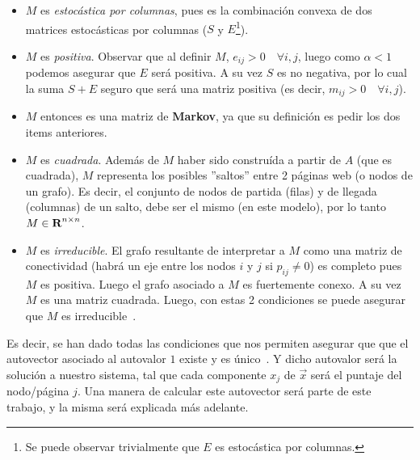 \begin{itemize}
    \item $M$ es \textit{estoc\'astica por columnas}, pues es la combinaci\'on convexa de
        dos matrices estoc\'asticas por columnas ($S$ y $E$\footnote{Se puede
        observar trivialmente que $E$ es estoc\'astica por columnas.}).

    \item $M$ es \textit{positiva}. Observar que al definir $M$, $e_{ij} >
        0\quad\forall i,j$, luego como $\alpha < 1$ podemos asegurar que $E$
        ser\'a positiva. A su vez $S$ es no negativa, por lo cual la suma $S+E$
        seguro que ser\'a una matriz positiva (es decir, $m_{ij} > 0
        \quad\forall i,j$).\label{itm:m_pos}

    \item $M$ entonces es una matriz de \textbf{Markov}, ya que su definici\'on
        es pedir los dos items anteriores.

    \item $M$ es \textit{cuadrada}. Adem\'as de $M$ haber sido constru\'ida a
        partir de $A$ (que es cuadrada), $M$ representa los posibles ''saltos''
        entre 2 p\'aginas web (o nodos de un grafo). Es decir, el conjunto de
        nodos de partida (filas) y de llegada (columnas) de un salto, debe ser
        el mismo (en este modelo), por lo tanto $M\in\hbox{\bf R}^{n\times n}$.

    \item $M$ es \textit{irreducible}. El grafo resultante de interpretar a $M$
        como una matriz de conectividad (habr\'a un eje entre los nodos $i$ y
        $j$ si $p_{ij}\neq 0$) es completo pues $M$ es positiva.  Luego el grafo
        asociado a $M$ es fuertemente conexo. A su vez $M$ es una matriz
        cuadrada. Luego, con estas 2 condiciones se puede asegurar que $M$ es
        irreducible~\cite[p.671]{Meyer2000}.
\end{itemize}
\smallskip

\par Es decir, se han dado todas las condiciones que nos permiten asegurar que
que el autovector asociado al autovalor $1$ existe y es
\'unico~\cite[p.663-693]{Meyer2000}. Y dicho autovalor ser\'a la soluci\'on a
nuestro sistema, tal que cada componente $x_j$ de $\vec{x}$ ser\'a el
puntaje del nodo/p\'agina $j$. Una manera de calcular este autovector ser\'a
parte de este trabajo, y la misma ser\'a explicada m\'as adelante.


